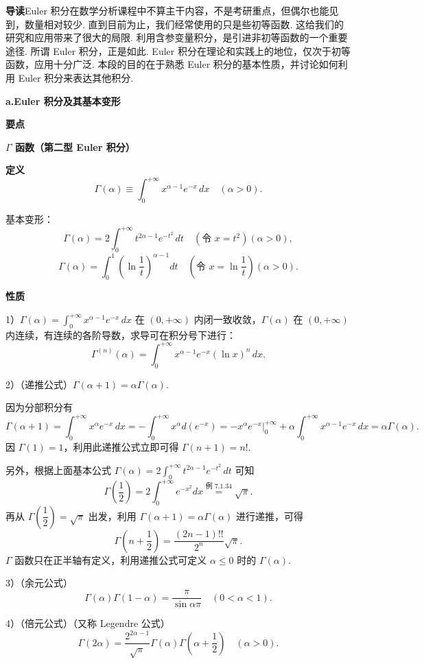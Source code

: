 \documentclass[UTF8, 12pt, fontset=fandol, oneside]{ctexart}
\begin{document}
\noindent\textbf{导读}\quad Euler 积分在数学分析课程中不算主干内容，不是考研重点，但偶尔也能见到，数量相对较少.
直到目前为止，我们经常使用的只是些初等函数. 这给我们的研究和应用带来了很大的局限. 利用含参变量积分，是引进非初等函数的一个重要途径. 所谓 Euler 积分，正是如此. Euler 积分在理论和实践上的地位，仅次于初等函数，应用十分广泛. 本段的目的在于熟悉 Euler 积分的基本性质，并讨论如何利用 Euler 积分来表达其他积分.

\noindent\textbf{a.\quad Euler 积分及其基本变形}

\noindent\textbf{要点}\quad

\noindent\textbf{$\Gamma$ 函数（第二型 Euler 积分）}

\noindent\textbf{定义}\quad
\[
\Gamma(\alpha)\equiv\int_0^{+\infty}x^{\alpha-1}e^{-x}\,dx\quad(\alpha>0).
\]

\noindent 基本变形：
\[
\Gamma(\alpha)=2\int_0^{+\infty}t^{2\alpha-1}e^{-t^2}\,dt
\quad(\text{令 }x=t^2)(\alpha>0),
\]
\[
\Gamma(\alpha)=\int_0^1\left(\ln\frac1t\right)^{\alpha-1}dt
\quad\left(\text{令 }x=\ln\frac1t\right)(\alpha>0).
\]

\noindent\textbf{性质}\quad

1）$\Gamma(\alpha)=\displaystyle\int_0^{+\infty}x^{\alpha-1}e^{-x}\,dx$ 在 $(0,+\infty)$ 内闭一致收敛，$\Gamma(\alpha)$ 在 $(0,+\infty)$ 内连续，有连续的各阶导数，求导可在积分号下进行：
\[
\Gamma^{(n)}(\alpha)=\int_0^{+\infty}x^{\alpha-1}e^{-x}(\ln x)^n\,dx.
\]

2）（递推公式）$\Gamma(\alpha+1)=\alpha\Gamma(\alpha)$.

因为分部积分有
\[
\Gamma(\alpha+1)=\int_0^{+\infty}x^\alpha e^{-x}\,dx
=-\int_0^{+\infty}x^\alpha d(e^{-x})
=-\left.x^\alpha e^{-x}\right|_0^{+\infty}
+\alpha\int_0^{+\infty}x^{\alpha-1}e^{-x}\,dx
=\alpha\Gamma(\alpha).
\]
因 $\Gamma(1)=1$，利用此递推公式立即可得 $\Gamma(n+1)=n!$.

另外，根据上面基本公式 $\Gamma(\alpha)=2\displaystyle\int_0^{+\infty}t^{2\alpha-1}e^{-t^2}\,dt$ 可知
\[
\Gamma\left(\frac12\right)=2\int_0^{+\infty}e^{-x^2}dx
\overset{\text{例 }7.1.34}{=}\sqrt\pi.
\]
再从 $\Gamma\left(\dfrac12\right)=\sqrt\pi$ 出发，利用 $\Gamma(\alpha+1)=\alpha\Gamma(\alpha)$ 进行递推，可得
\[
\Gamma\left(n+\frac12\right)=\frac{(2n-1)!!}{2^n}\sqrt\pi.
\]
$\Gamma$ 函数只在正半轴有定义，利用递推公式可定义 $\alpha\le0$ 时的 $\Gamma(\alpha)$.

3）（余元公式）
\[
\Gamma(\alpha)\Gamma(1-\alpha)=\frac{\pi}{\sin\alpha\pi}\quad(0<\alpha<1).
\]

4）（倍元公式）（又称 Legendre 公式）
\[
\Gamma(2\alpha)=\frac{2^{2\alpha-1}}{\sqrt\pi}\Gamma(\alpha)\Gamma\left(\alpha+\frac12\right)\quad(\alpha>0).
\]
\end{document}

